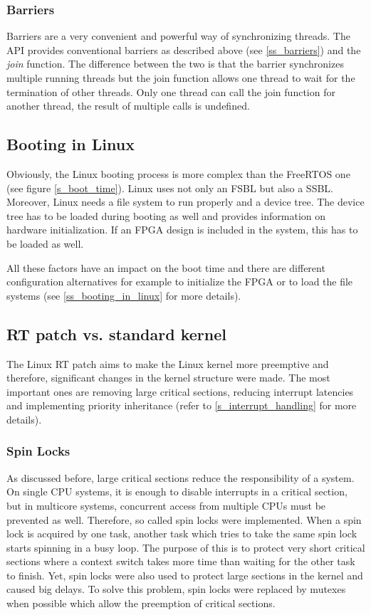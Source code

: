 \subsubsection{Barriers}
Barriers are a very convenient and powerful way of synchronizing threads. 
The \ac{API} provides conventional barriers as described above (see \ref{ss_barriers}) and the \textit{join} function.
The difference between the two is that the barrier synchronizes multiple running threads but the join function allows one thread to wait for the termination of other threads.
Only one thread can call the join function for another thread, the result of multiple calls is undefined.

\subsection{Booting in Linux}
Obviously, the Linux booting process is more complex than the FreeRTOS one (see figure \ref{s_boot_time}). 
Linux uses not only an \ac{FSBL} but also a \ac{SSBL}.
Moreover, Linux needs a file system to run properly and a device tree.
The device tree has to be loaded during booting as well and provides information on hardware initialization.
If an \ac{FPGA} design is included in the system, this has to be loaded as well.
\par
All these factors have an impact on the boot time and there are different configuration alternatives for example to initialize the \ac{FPGA} or to load the file systems (see \ref{ss_booting_in_linux} for more details). 

\subsection{RT patch vs. standard kernel}
The Linux RT patch aims to make the Linux kernel more preemptive and therefore, significant changes in the kernel structure were made.
The most important ones are removing large critical sections, reducing interrupt latencies and implementing priority inheritance (refer to \ref{s_interrupt_handling} for more details).

\subsubsection{Spin Locks}
As discussed before, large critical sections reduce the responsibility of a system.
On single \ac{CPU} systems, it is enough to disable interrupts in a critical section, but in multicore systems, concurrent access from multiple \acp{CPU} must be prevented as well.
Therefore, so called spin locks were implemented. 
When a spin lock is acquired by one task, another task which tries to take the same spin lock starts spinning in a busy loop.
The purpose of this is to protect very short critical sections where a context switch takes more time than waiting for the other task to finish.
Yet, spin locks were also used to protect large sections in the kernel and caused big delays.
To solve this problem, spin locks were replaced by mutexes when possible which allow the preemption of critical sections.   

